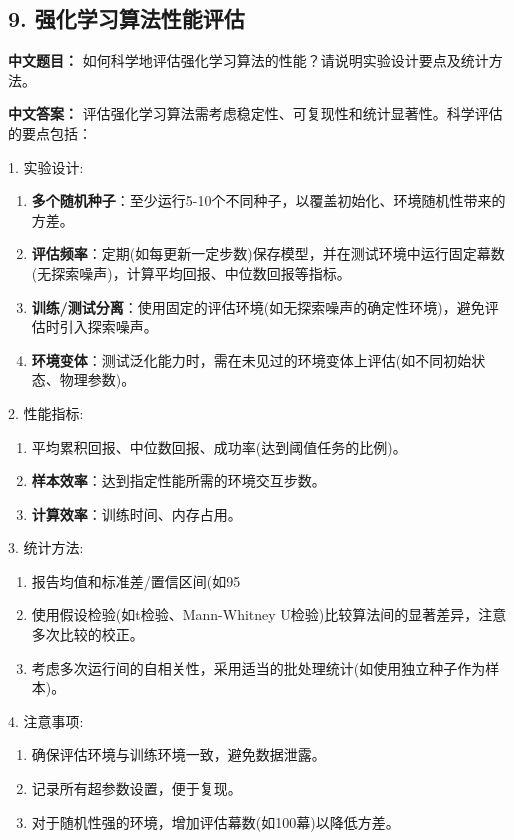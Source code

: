 \documentclass[10pt,a4paper]{ctexart}
\begin{document}
\subsection*{9. 强化学习算法性能评估}
\textbf{中文题目：} 如何科学地评估强化学习算法的性能？请说明实验设计要点及统计方法。

\textbf{中文答案：}  
评估强化学习算法需考虑稳定性、可复现性和统计显著性。科学评估的要点包括：

1.  实验设计:
\begin{enumerate}
       \item \textbf{多个随机种子}：至少运行5-10个不同种子，以覆盖初始化、环境随机性带来的方差。
       \item \textbf{评估频率}：定期(如每更新一定步数)保存模型，并在测试环境中运行固定幕数(无探索噪声)，计算平均回报、中位数回报等指标。
       \item \textbf{训练/测试分离}：使用固定的评估环境(如无探索噪声的确定性环境)，避免评估时引入探索噪声。
       \item \textbf{环境变体}：测试泛化能力时，需在未见过的环境变体上评估(如不同初始状态、物理参数)。
\end{enumerate}

2.  性能指标:
\begin{enumerate}
       \item 平均累积回报、中位数回报、成功率(达到阈值任务的比例)。
       \item \textbf{样本效率}：达到指定性能所需的环境交互步数。
       \item \textbf{计算效率}：训练时间、内存占用。
\end{enumerate}

3.  统计方法:
\begin{enumerate}
       \item 报告均值和标准差/置信区间(如95%
       \item 使用假设检验(如t检验、Mann-Whitney U检验)比较算法间的显著差异，注意多次比较的校正。
       \item 考虑多次运行间的自相关性，采用适当的批处理统计(如使用独立种子作为样本)。
\end{enumerate}

4.  注意事项:
\begin{enumerate}
       \item 确保评估环境与训练环境一致，避免数据泄露。
       \item 记录所有超参数设置，便于复现。
       \item 对于随机性强的环境，增加评估幕数(如100幕)以降低方差。
\end{enumerate}
\end{document}
